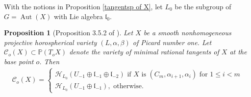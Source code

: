 \documentclass[12pt]{amsart}
\theoremstyle{plain}
\newtheorem{proposition}[theorem]{Proposition}
\theoremstyle{definition}
\def\Aut{\operatorname{Aut}}
\begin{document}
With the notions in Proposition \ref {tangentsp of X}, let $L_0$ be the subgroup of $G=\Aut(X)$ with Lie algebra $\mathfrak l_0$.

\begin{proposition} [Proposition 3.5.2 of \cite{Ki0}]\label{vmrt of X} Let $X$ be a smooth nonhomogeneous projective horospherical variety $(L, \alpha, \beta)$ of Picard number one.
 Let $\mathcal C_o(X) \subset \mathbb P (T_oX) $ denote  the variety of minimal rational tangents of $X$  at the base point $o$. Then
 \begin{eqnarray*}
 \mathcal C_o(X) = \left\{ \begin{array}{l}
 \mathcal H_{L_0}( U_{-1} \oplus\mathfrak l_{-1} \oplus \mathfrak l_{-2} ) \text{ if } X \text{ is }  (C_m, \alpha_{i+1}, \alpha_{i}) \text{ for }  1 \leq i < m \\
 \mathcal H_{L_0}(  U_{-1}\oplus \mathfrak l_{-1}), \text{ otherwise. }
 \end{array}\right.
   \end{eqnarray*}
\end{proposition}
\end{document}
